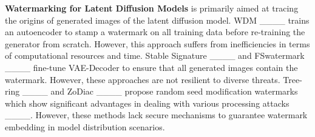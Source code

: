 

\noindent\textbf{Watermarking for Latent Diffusion Models} is primarily aimed at tracing the origins of generated images of the latent diffusion model. WDM ____ trains an autoencoder to stamp a watermark on all training data before re-training the generator from scratch. However, this approach suffers from inefficiencies in terms of computational resources and time. Stable Signature ____ and FSwatermark ____ fine-tune VAE-Decoder to ensure that all generated images contain the watermark. However, these approaches are not resilient to diverse threats. Tree-ring ____ and ZoDiac ____ propose random seed modification watermarks which show significant advantages in dealing with various processing attacks ____. However, these methods lack secure mechanisms to guarantee watermark embedding in model distribution scenarios. 



